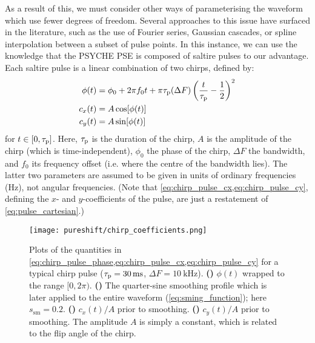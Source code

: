 As a result of this, we must consider other ways of parameterising the waveform which use fewer degrees of freedom.
Several approaches to this issue have surfaced in the literature, such as the use of Fourier series\autocite{Geen1989JMR,Geen1991JMR,Nuzillard1994JMRSA,Kupce1995JMRSA,Kupce1995JMRSB}, Gaussian cascades\autocite{Emsley1990CPL}, or spline interpolation between a subset of pulse points\autocite{Ewing1990CP}.
In this instance, we can use the knowledge that the PSYCHE PSE is composed of saltire pulses to our advantage.
Each saltire pulse is a linear combination of two chirps, defined by:
\begin{align}
    \phi(t) &= \phi_0 + 2\pi f_0 t + \pi\tau_\mathrm{p}(\Delta F)\left(\frac{t}{\tau_\mathrm{p}} - \frac{1}{2}\right)^2 \label{eq:chirp_pulse_phase} \\
    c_x(t) &= A \cos[\phi(t)] \label{eq:chirp_pulse_cx} \\
    c_y(t) &= A \sin[\phi(t)] \label{eq:chirp_pulse_cy}
\end{align}
for $t \in [0, \tau_\mathrm{p}]$. Here, $\tau_\mathrm{p}$ is the duration of the chirp, $A$ is the amplitude of the chirp (which is time-independent), $\phi_0$ the phase of the chirp, $\Delta F$ the bandwidth, and $f_0$ its frequency offset (i.e. where the centre of the bandwidth lies).
The latter two parameters are assumed to be given in units of ordinary frequencies (Hz), not angular frequencies.
(Note that \cref{eq:chirp_pulse_cx,eq:chirp_pulse_cy}, defining the $x$- and $y$-coefficients of the pulse, are just a restatement of \cref{eq:pulse_cartesian}.)

\begin{figure}[htb]
    \centering
    \texttt{[image: pureshift/chirp\_coefficients.png]}%
    {\label{fig:chirp_coefficients_phase}}%
    {\label{fig:chirp_coefficients_smoothing}}%
    {\label{fig:chirp_coefficients_cx}}%
    {\label{fig:chirp_coefficients_cy}}%
    \caption[Phase and Cartesian amplitudes of a typical chirp pulse]{
        Plots of the quantities in \cref{eq:chirp_pulse_phase,eq:chirp_pulse_cx,eq:chirp_pulse_cy} for a typical chirp pulse ($\taup = \SI{30}{\ms}$, $\Delta F = \SI{10}{\kHz}$).
        \textbf{()} $\phi(t)$ wrapped to the range $[0, 2\pi)$.
        \textbf{()} The quarter-sine smoothing profile which is later applied to the entire waveform (\cref{eq:sming_function}); here $s_\text{sm} = 0.2$.
        \textbf{()} $c_x(t)/A$ prior to smoothing.
        \textbf{()} $c_y(t)/A$ prior to smoothing.
        The amplitude $A$ is simply a constant, which is related to the flip angle of the chirp.\autocite{Foroozandeh2018CEJ}
    }
    \label{fig:chirp_coefficients}
\end{figure}

